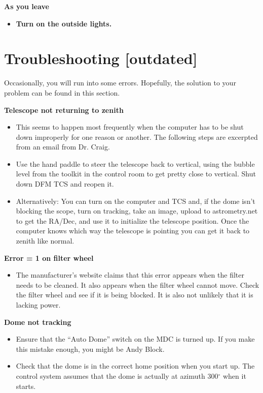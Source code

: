 \documentclass[letterpaper, 12pt]{report}
\begin{document}
\noindent
\large \textbf{As you leave}
\begin{itemize}
	\item \textbf{Turn on the outside lights.}
\end{itemize}

\newpage
\chapter{Troubleshooting [outdated]}
Occasionally, you will run into some errors. Hopefully, the solution to your problem can be found in this section.

\noindent\textbf{Telescope not returning to zenith}
\begin{itemize}
	\item This seems to happen most frequently when the computer has to be shut down improperly for one reason or another. The following steps are excerpted from an email from Dr. Craig.
	\item Use the hand paddle to steer the telescope back to vertical, using the bubble level from the toolkit in the control room to get pretty close to vertical. Shut down DFM TCS and reopen it.
	\item Alternatively: You can turn on the computer and TCS and, if the dome isn’t blocking the scope, turn on tracking, take an image, upload to astrometry.net to get the RA/Dec, and use it to initialize the telescope position. Once the computer knows which way the telescope is pointing you can get it back to zenith like normal.
\end{itemize}

\noindent\textbf{Error = 1 on filter wheel}
\begin{itemize}
	\item The manufacturer's website claims that this error appears when the filter needs to be cleaned. It also appears when the filter wheel cannot move. Check the filter wheel and see if it is being blocked. It is also not unlikely that it is lacking power.
\end{itemize}

\noindent \textbf{Dome not tracking}
\begin{itemize}
	\item Ensure that the ``Auto Dome'' switch on the MDC is turned up. If you make this mistake enough, you might be Andy Block.
	\item Check that the dome is in the correct home position when you start up. The control system assumes that the dome is actually at azimuth 300$^\circ$ when it starts.
\end{itemize}
\end{document}
